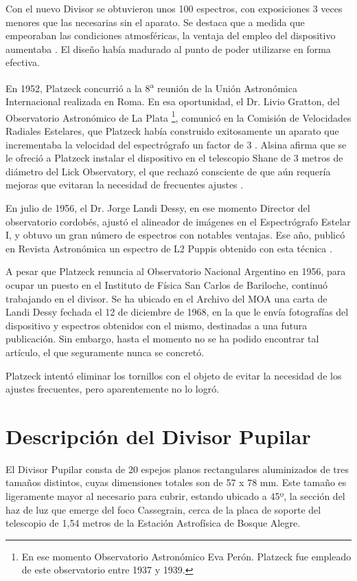\documentclass[baaa]{baaa}
\begin{document}
Con el nuevo Divisor se obtuvieron unos 100 espectros, con exposiciones 3 veces menores que las necesarias sin el aparato. Se destaca que a medida que empeoraban las condiciones atmosféricas, la ventaja del empleo del dispositivo aumentaba \citep{1953Platzeck}. El diseño había madurado al punto de poder utilizarse en forma efectiva. 

En 1952, Platzeck concurrió a la 8\textsuperscript{a} reunión de la Unión Astronómica Internacional realizada en Roma. En esa oportunidad, el Dr. Livio Gratton, del Observatorio Astronómico de La Plata \footnote{En ese momento Observatorio Astronómico Eva Perón. Platzeck fue empleado de este observatorio entre 1937 y 1939.}, comunicó en la Comisión de Velocidades Radiales Estelares, que Platzeck había construido exitosamente un aparato que incrementaba la velocidad del espectrógrafo un factor de 3 \citep{1954IAU}. Alsina afirma que se le ofreció a Platzeck instalar el dispositivo en el telescopio Shane de 3 metros de diámetro del Lick Observatory, el que rechazó consciente de que aún requería mejoras que evitaran la necesidad de frecuentes ajustes \citep{1983Alsina}. 

En julio de 1956, el Dr. Jorge Landi Dessy, en ese momento Director del observatorio cordobés, ajustó el alineador de imágenes en el Espectrógrafo Estelar I, y obtuvo un gran número de espectros con notables ventajas. Ese año, publicó en Revista Astronómica un espectro de L2 Puppis obtenido con esta técnica \citep{1956Landi}.

A pesar que Platzeck renuncia al Observatorio Nacional Argentino  en 1956, para ocupar un puesto en el Instituto de Física San Carlos de Bariloche, continuó trabajando en el divisor. Se ha ubicado en el Archivo del MOA una carta de Landi Dessy fechada el 12 de diciembre de 1968, en la que le envía fotografías del dispositivo y espectros obtenidos con el mismo, destinadas a una futura publicación. Sin embargo, hasta el momento no se ha podido encontrar tal artículo, el que seguramente nunca se concretó. 

Platzeck intentó eliminar los tornillos con el objeto de evitar la necesidad de los ajustes frecuentes, pero aparentemente no lo logró. 

\section{Descripción del Divisor Pupilar}

El Divisor Pupilar consta de 20 espejos planos rectangulares aluminizados de tres tamaños distintos, cuyas dimensiones totales son de 57 x 78 mm. Este tamaño es ligeramente mayor al necesario para cubrir, estando ubicado a 45º, la sección del haz de luz que emerge del foco Cassegrain, cerca de la placa de soporte del telescopio de 1,54 metros de la Estación Astrofísica de Bosque Alegre. 
\end{document}
